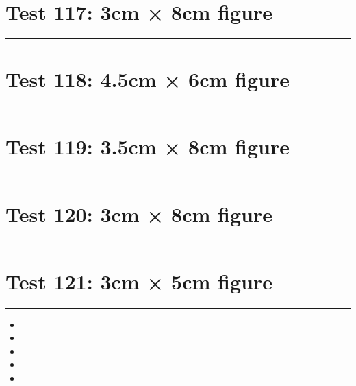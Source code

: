\documentclass[a4paper,11pt]{article}
\begin{document}
\section*{Test 117: 3cm × 8cm figure}
\begin{swarmwrap}%
  \begin{minipage}[t]{3cm}
    \centering
    \rule{\linewidth}{8cm}
  \end{minipage}%
\end{swarmwrap}%
\swarmwrapnext
\lipsum[105]
\lipsum[106]
\lipsum[107]
\lipsum[108]
\lipsum[109]
\section*{Test 118: 4.5cm × 6cm figure}
\begin{swarmwrap}%
  \begin{minipage}[t]{4cm}
    \centering
    \rule{\linewidth}{6cm}
  \end{minipage}%
\end{swarmwrap}%
\swarmwrapnext
\lipsum[51]
\lipsum[52]
\lipsum[53]
\lipsum[54]
\section*{Test 119: 3.5cm × 8cm figure}
\begin{swarmwrap}%
  \begin{minipage}[t]{3cm}
    \centering
    \rule{\linewidth}{8cm}
  \end{minipage}%
\end{swarmwrap}%
\swarmwrapnext
\lipsum[147]
\lipsum[148]
\lipsum[149]
\lipsum[150]
\section*{Test 120: 3cm × 8cm figure}
\begin{swarmwrap}%
  \begin{minipage}[t]{3cm}
    \centering
    \rule{\linewidth}{8cm}
  \end{minipage}%
\end{swarmwrap}%
\swarmwrapnext
\lipsum[79]
\lipsum[80]
\lipsum[81]
\section*{Test 121: 3cm × 5cm figure}
\begin{swarmwrap}%
  \begin{minipage}[t]{3cm}
    \centering
    \rule{\linewidth}{5cm}
  \end{minipage}%
\end{swarmwrap}%
\swarmwrapnext
\lipsum[149]
\begin{itemize}
  \item \lipsum[150][1-3]
  \item \lipsum[1][1-3]
  \item \lipsum[2][1-3]
  \item \lipsum[3][1-3]
  \item \lipsum[4][1-3]
\end{itemize}
\end{document}
